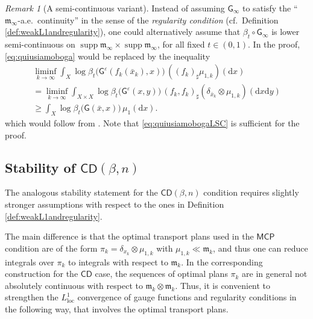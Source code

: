 \documentclass[11pt,a4paper]{article}
\theoremstyle{plain}
\theoremstyle{definition}
\theoremstyle{remark}
\newtheorem{remark}[theorem]{Remark}
\numberwithin{equation}{section}
\DeclareMathOperator{\supp}{\mathrm{supp}}
\newcommand{\ve}{\varepsilon}
\newcommand{\CD}{\mathsf{CD}}
\newcommand{\MCP}{\mathsf{MCP}}
\newcommand{\loc}{\mathrm{loc}}
\newcommand{\di}{\mathrm{d}}
\newcommand{\mm}{\mathfrak m}
\newcommand{\sfG}{\mathsf G}
\begin{document}
\begin{remark}[A semi-continuous variant]
Instead of assuming $\sfG_\infty$ to satisfy the ``$\mm_\infty$-a.e.\ continuity''  in the sense of the \emph{regularity condition} (cf.\ Definition \ref{def:weakL1andregularity}), one could alternatively assume that $\beta_{t}\circ \sfG_{\infty}$ is lower semi-continuous on $\supp \mm_{\infty} \times \supp \mm_{\infty}$, for all fixed $t\in (0,1)$. In the proof, \eqref{eq:quiusiamoboga} would be replaced by the inequality
\begin{multline}
\liminf_{k\to \infty}   \int_{X} \log\beta_t\big(\sfG^{\ve}(f_k(\bar{x}_k),x)\big)\,((f_k)_\sharp\mu_{1,k})(\di x)  \\ 
 = \liminf_{k\to \infty}  \int_{X\times X} \log\beta_t\big(\sfG^{\ve}(x,y)\big)\,(f_k,f_k)_\sharp \left(\delta_{\bar{x}_k}\otimes \mu_{1,k}\right)(\di x \di y) \\
 \geq \int_{X} \log\beta_t\big(\sfG(\bar{x},x)\big)\,\mu_1(\di x).\label{eq:quiusiamobogaLSC}
\end{multline}
which would follow from \cite[Cor.\ 2.2.6]{Bogachev-Weak}.  Note that  \eqref{eq:quiusiamobogaLSC} is sufficient for the proof.
\end{remark}

\subsection{Stability of \texorpdfstring{$\CD(\beta,n)$}{CD}}

The analogous stability statement for the $\CD(\beta,n)$ condition requires slightly stronger assumptions with respect to the ones in Definition \ref{def:weakL1andregularity}. 

The main difference is that the optimal transport plans used in the $\MCP$ condition are of the form $\pi_k=\delta_{x_k}\otimes \mu_{1,k}$ with $\mu_{1,k} \ll \mm_k$, and thus one can reduce integrals over $\pi_k$ to integrals with respect to $\mm_k$. In the corresponding construction for the $\CD$ case, the sequences of optimal plans $\pi_k$ are in general not absolutely continuous with respect to $\mm_k\otimes \mm_k$. Thus, it is convenient to strengthen the $L^1_{\loc}$ convergence of gauge functions and regularity conditions in the following way, that involves the optimal transport plans.
\end{document}
